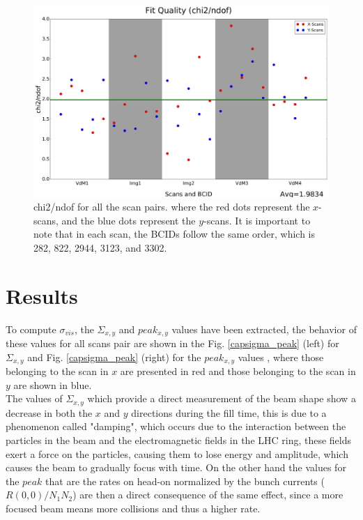 \begin{center}
  \begin{figure}[h!]
    \centering
    \includegraphics[scale=.30]{Chapter4/DGConst_chi2.png}
    \caption[$\chi^{2}$/ndof per BCID for all scan pairs]{ chi2/ndof for all the scan pairs.  where the red dots represent the $x$-scans, and the blue dots represent the $y$-scans. It is important to note that in each scan, the BCIDs follow the same order, which is 282, 822, 2944, 3123, and 3302.} 
    \label{chi2/ndof}
  \end{figure}
\end{center}

\section{Results}

To compute $\sigma_{vis}$, the $\Sigma_{x,y}$ and $peak_{x,y}$ values have been extracted, the behavior of these values ​​for all scans pair are shown in the  Fig. \ref{capsigma_peak} (left) for $\Sigma_{x,y}$ and Fig. \ref{capsigma_peak} (right) for the $peak_{x,y}$ values , where those belonging to the scan in $x$ are presented in red and those belonging to the scan in $y$ are shown in blue.\\

The values of $\Sigma_{x,y}$ which provide a direct measurement of the beam shape show a decrease in both the $x$ and $y$ directions during the fill time, this is due to a phenomenon called "damping", which occurs due to the interaction between the particles in the beam and the electromagnetic fields in the LHC ring, these fields exert a force on the particles, causing them to lose energy and amplitude, which causes the beam to gradually focus with time. On the other hand the values ​​for the $peak$ that are the rates on head-on normalized by the bunch currents ($R(0,0)/N_{1}N_{2}$) are then a direct consequence of the same effect, since a more focused beam means more collisions and thus a higher rate.\\

